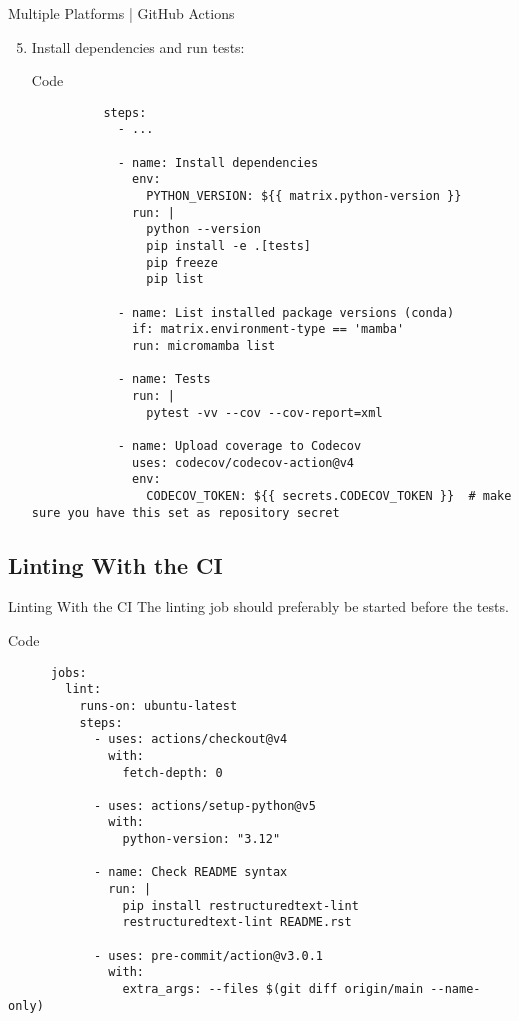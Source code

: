 \begin{frame}[fragile]{
    Multiple Platforms | GitHub Actions
  }
  \begin{enumerate}
    \setcounter{enumi}{4}
    \item Install dependencies and run tests:
      \begin{block}{Code}
        \scriptsize
        \begin{verbatim}
          steps:
            - ...

            - name: Install dependencies
              env:
                PYTHON_VERSION: ${{ matrix.python-version }}
              run: |
                python --version
                pip install -e .[tests]
                pip freeze
                pip list

            - name: List installed package versions (conda)
              if: matrix.environment-type == 'mamba'
              run: micromamba list

            - name: Tests
              run: |
                pytest -vv --cov --cov-report=xml

            - name: Upload coverage to Codecov
              uses: codecov/codecov-action@v4
              env:
                CODECOV_TOKEN: ${{ secrets.CODECOV_TOKEN }}  # make sure you have this set as repository secret
        \end{verbatim}
      \end{block}
  \end{enumerate}
\end{frame}

\subsection{Linting With the CI}
\begin{frame}[fragile]{Linting With the CI}
  The linting job should preferably be started before the tests.
  \begin{block}{Code}
  \footnotesize
    \begin{verbatim}
      jobs:
        lint:
          runs-on: ubuntu-latest
          steps:
            - uses: actions/checkout@v4
              with:
                fetch-depth: 0

            - uses: actions/setup-python@v5
              with:
                python-version: "3.12"

            - name: Check README syntax
              run: |
                pip install restructuredtext-lint
                restructuredtext-lint README.rst

            - uses: pre-commit/action@v3.0.1
              with:
                extra_args: --files $(git diff origin/main --name-only)
    \end{verbatim}
  \end{block}
\end{frame}


